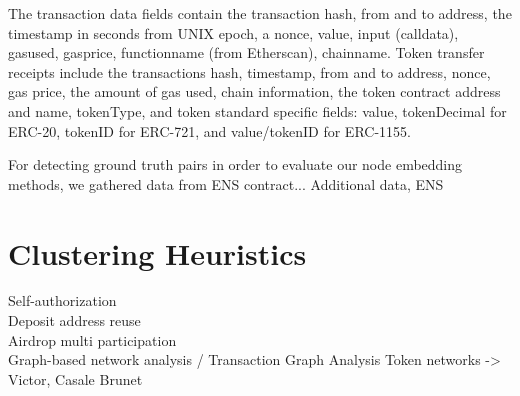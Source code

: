 \documentclass[12pt,a4paper,titlepage,oneside,english]{article}
\begin{document}
The transaction data fields contain the transaction hash, from and to address, the timestamp in seconds from UNIX epoch, a nonce, value, input (calldata), gasused, gasprice, functionname (from Etherscan), chainname.
Token transfer receipts include the transactions hash, timestamp, from and to address, nonce, gas price, the amount of gas used, chain information, the token contract address and name, tokenType, and token standard specific fields: value, tokenDecimal for ERC-20, tokenID for ERC-721, and value/tokenID for ERC-1155.



For detecting ground truth pairs in order to evaluate our node embedding methods, we gathered data from ENS contract...
Additional data, ENS \\



\section{Clustering Heuristics}

Self-authorization \\
Deposit address reuse \\
Airdrop multi participation \\

Graph-based network analysis / Transaction Graph Analysis
Token networks -> Victor, Casale Brunet

\end{document}
